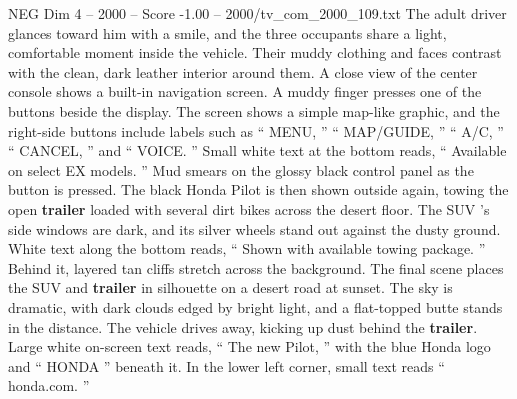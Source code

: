 \begin{textsample}{NEG Dim 4 – 2000 – Score -1.00 – 2000/tv\_com\_2000\_109.txt}
The adult driver glances toward him with a smile, and the three occupants share a light, comfortable moment inside the vehicle.
Their muddy clothing and faces contrast with the clean, dark leather interior around them.
A close view of the center console shows a built-in navigation screen.
A muddy finger presses one of the buttons beside the display.
The screen shows a simple map-like graphic, and the right-side buttons include labels such as “ MENU, ” “ MAP/GUIDE, ” “ A/C, ” “ CANCEL, ” and “ VOICE. ” Small white text at the bottom reads, “ Available on select EX models. ” Mud smears on the glossy black control panel as the button is pressed.
The black Honda Pilot is then shown outside again, towing the open \textbf{trailer} loaded with several dirt bikes across the desert floor.
The SUV ’s side windows are dark, and its silver wheels stand out against the dusty ground.
White text along the bottom reads, “ Shown with available towing package. ” Behind it, layered tan cliffs stretch across the background.
The final scene places the SUV and \textbf{trailer} in silhouette on a desert road at sunset.
The sky is dramatic, with dark clouds edged by bright light, and a flat-topped butte stands in the distance.
The vehicle drives away, kicking up dust behind the \textbf{trailer}.
Large white on-screen text reads, “ The new Pilot, ” with the blue Honda logo and “ HONDA ” beneath it.
In the lower left corner, small text reads “ honda.com. ”

\end{textsample}
